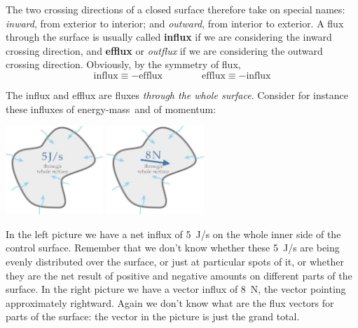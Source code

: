 \documentclass[a4paper,12pt,%
onecolumn,oneside,%
british%
]{memoir}
\renewcommand*{\|}[1][]{\nonscript\:#1\vert\nonscript\:\mathopen{}}
\newcommand*{\energym}{energy-mass}
\begin{document}
The two crossing directions of a closed surface therefore take on special names: \emph{inward}, from exterior to interior; and \emph{outward}, from interior to exterior. A flux through the surface is usually called \textbf{influx} if we are considering the inward crossing direction, and \textbf{efflux} or \emph{outflux} if we are considering the outward crossing direction. Obviously, by the symmetry of flux,
\begin{equation*}
  \text{influx} \equiv -\text{efflux}
  \qquad\qquad
  \text{efflux} \equiv -\text{influx}
\end{equation*}



The influx and efflux are fluxes \emph{through the whole surface}. Consider for instance these influxes of \energym\ and of momentum:
\begin{center}
  \hspace*{\fill}
  \includegraphics[height=9em]{images/influx_J.jpg}
  \hfill
  \includegraphics[height=9em]{images/influx_N.jpg}
  \hspace*{\fill}
\end{center}
In the left picture we have a net influx of \qty{5}{J/s} on the whole inner side of the control surface. Remember that we don't know whether these \qty{5}{J/s} are being evenly distributed over the surface, or just at particular spots of it, or whether they are the net result of positive and negative amounts on different parts of the surface. In the right picture we have a vector influx of \qty{8}{N}, the vector pointing approximately rightward. Again we don't know what are the flux vectors for parts of the surface: the vector in the picture is just the grand total.
\end{document}
